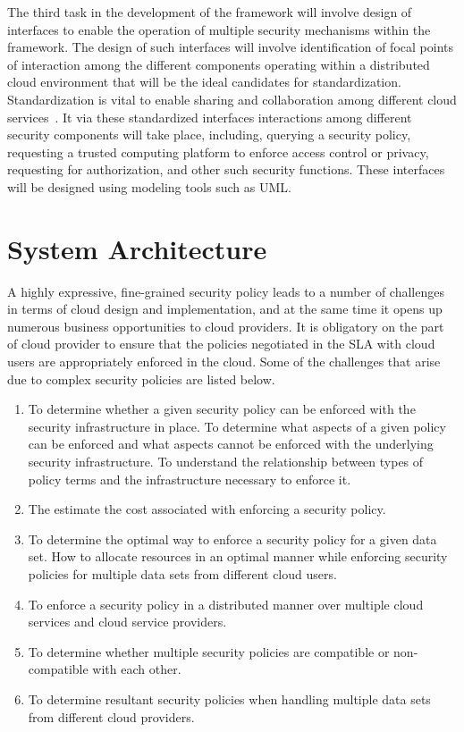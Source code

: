 \documentclass[10pt, conference, compsoc]{IEEEtran}
\begin{document}
The third task in the development of the framework will involve design of interfaces to enable the operation of multiple security mechanisms within the framework. The design of such interfaces will involve identification of  focal points of interaction among the different components operating within a distributed cloud environment that will be the ideal candidates for standardization. Standardization is vital to enable sharing and collaboration among different cloud services~\cite{HPCloud1}. It via these standardized interfaces interactions among different security components will take place, including, querying a security policy, requesting a trusted computing platform to enforce access control or privacy, requesting for authorization, and other such security functions. These interfaces will be designed using modeling tools such as UML.


\section{System Architecture}
A highly expressive, fine-grained security policy leads to a number of challenges in terms of cloud design and implementation, and at the same time it  opens up numerous business opportunities to cloud providers. It is obligatory on the part of cloud provider to ensure that the policies negotiated in the SLA with cloud users are appropriately enforced in the cloud. Some of the challenges that arise due to complex security policies are listed below. 

\begin{enumerate}
\item To determine whether a given security policy can be enforced with the security infrastructure in place. To determine what aspects of a given policy can be enforced and what aspects cannot be enforced with the underlying security infrastructure. To understand the relationship between types of policy terms  and the infrastructure necessary to enforce it. 
\item The estimate the cost associated with enforcing a security policy.
\item To determine the optimal way to enforce a security policy for a given data set. How to allocate resources in an optimal manner while enforcing security policies for multiple data sets from different cloud users. 
\item To enforce a security policy in a distributed manner over multiple cloud services and cloud service providers.
\item To determine whether multiple security policies are compatible or non-compatible with each other.
\item To determine resultant security policies when handling multiple data sets from different cloud providers.
\end{enumerate}
\end{document}

